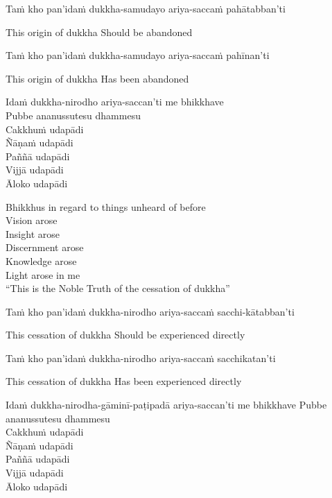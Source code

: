 Taṁ kho pan’idaṁ dukkha-samudayo ariya-saccaṁ pahātabban’ti

\begin{cprenglish}
This origin of dukkha
Should be abandoned
\end{cprenglish}

Taṁ kho pan’idaṁ dukkha-samudayo ariya-saccaṁ pahīnan’ti

\begin{cprenglish}
This origin of dukkha
Has been abandoned
\end{cprenglish}

Idaṁ dukkha-nirodho ariya-saccan’ti me bhikkhave\\
Pubbe ananussutesu dhammesu\\
Cakkhuṁ udapādi\\
Ñāṇaṁ udapādi\\
Paññā udapādi\\
Vijjā udapādi\\
Āloko udapādi

\begin{cprenglish}
Bhikkhus in regard to things unheard of before\\
Vision arose\\
Insight arose\\
Discernment arose\\
Knowledge arose\\
Light arose in me\\
“This is the Noble Truth of the cessation of dukkha”
\end{cprenglish}

Taṁ kho pan’idaṁ dukkha-nirodho ariya-saccaṁ sacchi-kātabban’ti

\begin{cprenglish}
This cessation of dukkha
Should be experienced directly
\end{cprenglish}

Taṁ kho pan’idaṁ dukkha-nirodho ariya-saccaṁ sacchikatan’ti

\begin{cprenglish}
This cessation of dukkha
Has been experienced directly
\end{cprenglish}

Idaṁ dukkha-nirodha-gāminī-paṭipadā ariya-saccan’ti me bhikkhave
Pubbe ananussutesu dhammesu\\
Cakkhuṁ udapādi\\
Ñāṇaṁ udapādi\\
Paññā udapādi\\
Vijjā udapādi\\
Āloko udapādi

